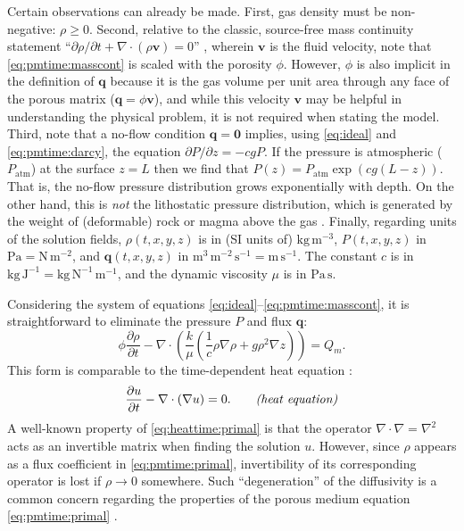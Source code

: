 \documentclass[11pt]{amsart}
\newcommand{\bq}{\mathbf{q}}
\newcommand{\bv}{\mathbf{v}}
\newcommand{\bzero}{\bm{0}}
\newcommand{\Div}{\nabla\cdot}
\newcommand{\grad}{\nabla}
\newcommand{\Patm}{P_{\text{atm}}}
\begin{document}
Certain observations can already be made.  First, gas density must be non-negative: $\rho\ge 0$.  Second, relative to the classic, source-free mass continuity statement ``$\partial\rho/\partial t + \Div(\rho \bv)=0$'' \citep[equation (4.3)]{Tadmor2012}, wherein $\bv$ is the fluid velocity, note that \eqref{eq:pmtime:masscont} is scaled with the porosity $\phi$.  However, $\phi$ is also implicit in the definition of $\bq$ because it is the gas volume per unit area through any face of the porous matrix ($\bq = \phi \bv$), and while this velocity $\bv$ may be helpful in understanding the physical problem, it is not required when stating the model.  Third, note that a no-flow condition $\bq=\bzero$ implies, using \eqref{eq:ideal} and \eqref{eq:pmtime:darcy}, the equation $\partial P/\partial z = -cg P$.  If the pressure is atmospheric ($\Patm$) at the surface $z=L$ then we find that $P(z) = \Patm \exp(cg(L-z))$.  That is, the no-flow pressure distribution grows exponentially with depth.  On the other hand, this is \emph{not} the lithostatic pressure distribution, which is generated by the weight of (deformable) rock or magma above the gas \citep[equation (5)]{Collinson2012}.  Finally, regarding units of the solution fields, $\rho(t,x,y,z)$ is in (SI units of) $\text{kg}\,\text{m}^{-3}$, $P(t,x,y,z)$ in $\text{Pa} = \text{N}\,\text{m}^{-2}$, and $\bq(t,x,y,z)$ in $\text{m}^3\,\text{m}^{-2}\,\text{s}^{-1} = \text{m}\,\text{s}^{-1}$.  The constant $c$ is in $\text{kg}\,\text{J}^{-1} = \text{kg}\,\text{N}^{-1}\,\text{m}^{-1}$, and the dynamic viscosity $\mu$ is in $\text{Pa}\,\text{s}$.

Considering the system of equations \eqref{eq:ideal}--\eqref{eq:pmtime:masscont}, it is straightforward to eliminate the pressure $P$ and flux $\bq$:
\begin{equation}
\phi \frac{\partial \rho}{\partial t} - \Div \left(\frac{k}{\mu} \left(\frac{1}{c} \rho \grad \rho + g \rho^2 \grad z\right)\right) = Q_m. \label{eq:pmtime:primal}
\end{equation}
This form is comparable to the time-dependent heat equation \citep{Evans2010}:
\begin{equation}
\frac{\partial u}{\partial t} - \Div(\grad u) = 0. \qquad \text{\emph{(heat equation)}}\label{eq:heattime:primal}
\end{equation}
A well-known property of \eqref{eq:heattime:primal} is that the operator $\Div \grad = \grad^2$ acts as an invertible matrix when finding the solution $u$.  However, since $\rho$ appears as a flux coefficient in \eqref{eq:pmtime:primal}, invertibility of its corresponding operator is lost if $\rho\to 0$ somewhere.  Such ``degeneration'' of the diffusivity is a common concern regarding the properties of the porous medium equation \eqref{eq:pmtime:primal} \citep[for example]{Vazquez2007}.
\end{document}
